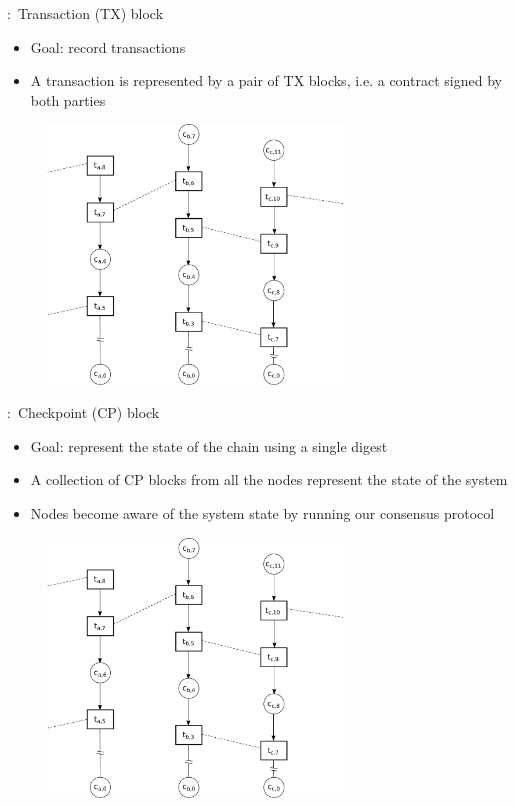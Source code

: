 \documentclass{beamer}
\begin{document}
\begin{frame}{\subsecname:~Transaction (TX) block}
\begin{itemize}
  \item Goal: record transactions
  \item A transaction is represented by a pair of TX blocks,
  i.e. a contract signed by both parties
\end{itemize}
\begin{figure}[h]
  \includegraphics[trim={7cm 8.2cm 2cm 2.55cm},clip,width=0.7\textwidth]{trustchain-good-cp}
  \centering
\end{figure}
\end{frame}

\begin{frame}{\subsecname:~Checkpoint (CP) block}
  \begin{itemize}
    \item Goal: represent the state of the chain using a single digest
    \item A collection of CP blocks from all the nodes represent the state of the system
    \item Nodes become aware of the system state by running our consensus protocol
  \end{itemize}
\begin{figure}[h]
  \includegraphics[trim={7cm 2.505cm 2cm 8.55cm},clip,width=0.7\textwidth]{trustchain-good-cp}
  \centering
\end{figure}
\end{frame}
\end{document}
